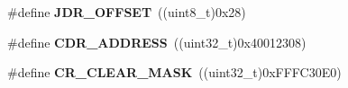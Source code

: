 \begin{DoxyCompactItemize}
\item 
\#define {\bfseries J\+D\+R\+\_\+\+O\+F\+F\+S\+ET}~((uint8\+\_\+t)0x28)\hypertarget{group___a_d_c_gad2480fae33dfd1308157c313af8e6a5d}{}\label{group___a_d_c_gad2480fae33dfd1308157c313af8e6a5d}

\item 
\#define {\bfseries C\+D\+R\+\_\+\+A\+D\+D\+R\+E\+SS}~((uint32\+\_\+t)0x40012308)\hypertarget{group___a_d_c_ga92ecbad71393fbbf41b5d030ecc16899}{}\label{group___a_d_c_ga92ecbad71393fbbf41b5d030ecc16899}

\item 
\#define {\bfseries C\+R\+\_\+\+C\+L\+E\+A\+R\+\_\+\+M\+A\+SK}~((uint32\+\_\+t)0x\+F\+F\+F\+C30\+E0)\hypertarget{group___a_d_c_ga8a5812a1d5ced986bb997a4bb7ae697d}{}\label{group___a_d_c_ga8a5812a1d5ced986bb997a4bb7ae697d}

\end{DoxyCompactItemize}
